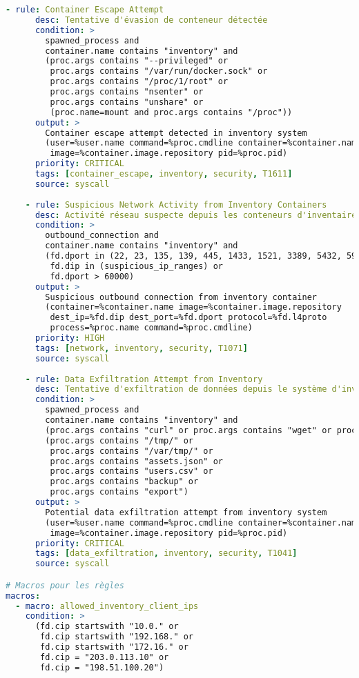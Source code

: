 \documentclass[12pt,a4paper]{report}
\begin{document}
\begin{lstlisting}[language=YAML, caption=Configuration Falco avancée pour conteneurs]
    - rule: Container Escape Attempt
      desc: Tentative d'évasion de conteneur détectée
      condition: >
        spawned_process and 
        container.name contains "inventory" and
        (proc.args contains "--privileged" or
         proc.args contains "/var/run/docker.sock" or
         proc.args contains "/proc/1/root" or
         proc.args contains "nsenter" or
         proc.args contains "unshare" or
         (proc.name=mount and proc.args contains "/proc"))
      output: >
        Container escape attempt detected in inventory system
        (user=%user.name command=%proc.cmdline container=%container.name
         image=%container.image.repository pid=%proc.pid)
      priority: CRITICAL
      tags: [container_escape, inventory, security, T1611]
      source: syscall
    
    - rule: Suspicious Network Activity from Inventory Containers
      desc: Activité réseau suspecte depuis les conteneurs d'inventaire
      condition: >
        outbound_connection and 
        container.name contains "inventory" and
        (fd.dport in (22, 23, 135, 139, 445, 1433, 1521, 3389, 5432, 5984, 6379, 11211, 27017) or
         fd.dip in (suspicious_ip_ranges) or
         fd.dport > 60000)
      output: >
        Suspicious outbound connection from inventory container
        (container=%container.name image=%container.image.repository
         dest_ip=%fd.dip dest_port=%fd.dport protocol=%fd.l4proto
         process=%proc.name command=%proc.cmdline)
      priority: HIGH
      tags: [network, inventory, security, T1071]
      source: syscall
    
    - rule: Data Exfiltration Attempt from Inventory
      desc: Tentative d'exfiltration de données depuis le système d'inventaire
      condition: >
        spawned_process and 
        container.name contains "inventory" and
        (proc.args contains "curl" or proc.args contains "wget" or proc.args contains "scp") and
        (proc.args contains "/tmp/" or 
         proc.args contains "/var/tmp/" or
         proc.args contains "assets.json" or
         proc.args contains "users.csv" or
         proc.args contains "backup" or
         proc.args contains "export")
      output: >
        Potential data exfiltration attempt from inventory system
        (user=%user.name command=%proc.cmdline container=%container.name
         image=%container.image.repository pid=%proc.pid)
      priority: CRITICAL
      tags: [data_exfiltration, inventory, security, T1041]
      source: syscall

# Macros pour les règles
macros:
  - macro: allowed_inventory_client_ips
    condition: >
      (fd.cip startswith "10.0." or
       fd.cip startswith "192.168." or
       fd.cip startswith "172.16." or
       fd.cip = "203.0.113.10" or
       fd.cip = "198.51.100.20")
  

\end{lstlisting}
\end{document}
